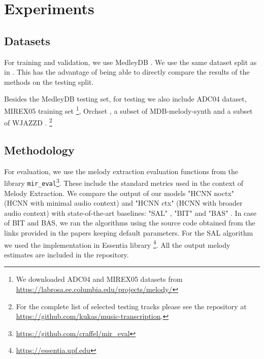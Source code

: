 \documentclass{article}
\begin{document}
\section{Experiments}

\subsection{Datasets}

For training and validation, we use MedleyDB \cite{Bittner2014}. We use the same dataset split as in \cite{DBasaranSEssid2018,Bittner2017}. This has the advantage of being able to directly compare the results of the methods on the testing split. 

Besides the MedleyDB testing set, for testing we also include ADC04 dataset, MIREX05 training set \footnote{We downloaded ADC04 and MIREX05 datasets from \url{https://labrosa.ee.columbia.edu/projects/melody/}}, Orchset \cite{Bosch2016}, a subset of MDB-melody-synth \cite{Salamon2017} and a subset of WJAZZD \cite{Pfleiderer}. \footnote{For the complete list of selected testing tracks please see the repository at \url{https://github.com/kukas/music-transcription}.}

\subsection{Methodology}

For evaluation, we use the melody extraction evaluation functions from the library \texttt{mir\_eval}\footnote{\url{https://github.com/craffel/mir_eval}}. These include the standard metrics used in the context of Melody Extraction. We compare the output of our models "HCNN noctx" (HCNN with minimal audio context) and "HCNN ctx" (HCNN with broader audio context) with state-of-the-art baselines: "SAL" \cite{Salamon2012a}, "BIT" \cite{Bittner2017} and "BAS" \cite{DBasaranSEssid2018}. In case of BIT and BAS, we ran the algorithms using the source code obtained from the links provided in the papers keeping default parameters. For the SAL algorithm we used the implementation in Essentia library \footnote{\url{https://essentia.upf.edu}}. All the output melody estimates are included in the repository.

\end{document}
